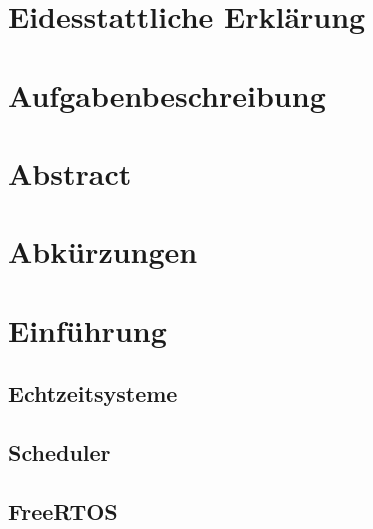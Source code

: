 \documentclass{scrartcl}
\begin{document}
	\begin{titlepage}
		
	\end{titlepage}
	\clearpage 
	\section*{Eidesstattliche Erklärung}
		
		\clearpage
	\section*{Aufgabenbeschreibung}
		
		\clearpage
	\section*{Abstract}
		
		\clearpage
	\tableofcontents
		\clearpage
	\section*{Abkürzungen}
		
		\clearpage
	\section{Einführung}
		
		\clearpage
		\subsection{Echtzeitsysteme}
			
		\subsection{Scheduler}
			
		\subsection{FreeRTOS}
			
		\clearpage
	\listoffigures
		\clearpage
	\listoftables
		\clearpage
\end{document}
